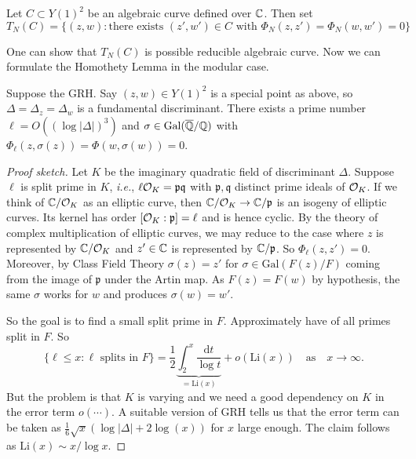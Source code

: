 \begin{definition}
  Let $C\subset Y(1)^2$ be an algebraic curve defined over ${\mathbb{C}}$. Then set
  \begin{equation*}
    T_N(C) = \{(z,w) : \text{there exists $(z',w')\in C$ with $\Phi_N(z,z')=\Phi_N(w,w')=0$}\}
  \end{equation*}  
\end{definition}

One can show that $T_N(C)$ is possible reducible algebraic curve.
Now we can formulate the Homothety Lemma in the modular case.

\begin{lemma}
  Suppose the GRH.
  Say $(z,w)\in Y(1)^2$ is a special point as above, so %
 $\Delta=\Delta_z=\Delta_w$ is a fundamental discriminant.
  There exists a prime number $\ell=O((\log
  |\Delta|)^3)$ and $\sigma\in \mathrm{Gal}({\overline{\mathbb{Q}}}/{\mathbb{Q}})$  with $\Phi_\ell(z,\sigma(z))=\Phi(w,\sigma(w))=0$. 
\end{lemma}
\begin{proof}[Proof sketch]
  Let $K$ be the imaginary quadratic field of discriminant $\Delta$.
  Suppose $\ell$ is split prime in $K$, \textit{i.e.}, $\ell{\mathcal O}_K =
  \mathfrak{p}\mathfrak{q}$ with $  \mathfrak{p},\mathfrak{q}$
  distinct prime ideals of ${\mathcal O}_K$.
  If we think of ${\mathbb{C}}/{\mathcal O}_K$ as an elliptic curve,
  then ${\mathbb{C}}/{\mathcal O}_K \rightarrow {\mathbb{C}}/\mathfrak{p}$ is an isogeny of
  elliptic curves. Its kernel has order $[{\mathcal O}_K:\mathfrak{p}]=\ell$
  and is hence cyclic. By the theory of complex multiplication of
  elliptic curves, we may reduce to the case where $z$ is
  represented by ${\mathbb{C}}/{\mathcal O}_K$ and $z'\in {\mathbb{C}}$ is represented by
  ${\mathbb{C}}/\mathfrak{p}$. So $\Phi_{\ell}(z,z')=0$. 
  Moreover, by Class Field Theory $\sigma(z)=z'$ for $\sigma \in
  \mathrm{Gal}(F(z)/F)$ coming from the image of $\mathfrak{p}$ under
  the Artin map. As $F(z)=F(w)$ by hypothesis, the same $\sigma$ works
  for $w$ and produces $\sigma(w)=w'$.

  So the goal is to find a small split prime in $F$. Approximately
  have of all primes split in $F$. So
  \begin{equation*}
    \{\ell \le x : \ell \text{ splits in }F\} = \frac 12 \underbrace{\int_2^x
      \frac{\mathrm{d} t}{\log t}}_{=\mathrm{Li}(x)} + o(\mathrm{Li}(x))
    \quad\text{as}\quad x\rightarrow\infty. 
  \end{equation*}
  But the problem is that $K$ is
  varying and we need a good dependency on $K$ in the error term
  $o(\cdots)$.
  A suitable version of GRH tells us that the error term can be taken
  as
  $\frac 16 \sqrt x (\log|\Delta| + 2\log(x))$ for $x$ large enough.
  The claim follows as $\mathrm{Li}(x)\sim x/\log x$. 
\end{proof}

